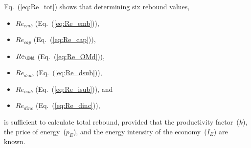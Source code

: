 Eq.~(\ref{eq:Re_tot}) shows that determining six rebound values,
%
\begin{itemize}

  \item $Re_{emb}$ (Eq.~(\ref{eq:Re_emb})), 

  \item $Re_{cap}$ (Eq.~(\ref{eq:Re_cap})), 
  
  \item $Re_{\OMd}$ (Eq.~(\ref{eq:Re_OMd})),
  
  \item $Re_{dsub}$ (Eq.~(\ref{eq:Re_dsub})),
  
  \item $Re_{isub}$ (Eq.~(\ref{eq:Re_isub})), and
  
  \item $Re_{dinc}$ (Eq.~(\ref{eq:Re_dinc})),

\end{itemize}
%
is sufficient to calculate total rebound, 
provided that 
the productivity factor~($k$),
the price of energy~($p_E$), and
the energy intensity of the economy~($I_E$) 
are known.
